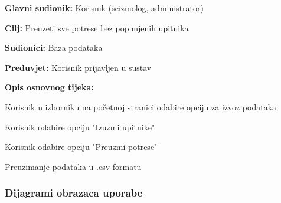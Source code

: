 			\noindent {}
			\begin{packed_item}
				
				\item \textbf{Glavni sudionik:} Korisnik (seizmolog, administrator)
				\item \textbf{Cilj:} Preuzeti sve potrese bez popunjenih upitnika
				\item \textbf{Sudionici:} Baza podataka
				\item \textbf{Preduvjet:} Korisnik prijavljen u sustav
				\item \textbf{Opis osnovnog tijeka:}
				
				\item[] \begin{packed_enum}
					\item Korisnik u izborniku na početnoj stranici odabire opciju za izvoz podataka
					\item Korisnik odabire opciju "Izuzmi upitnike"
					\item Korisnik odabire opciju "Preuzmi potrese"
					\item Preuzimanje podataka u .csv formatu
				\end{packed_enum}
				
			\end{packed_item}
					
				\subsubsection{Dijagrami obrazaca uporabe}
					
